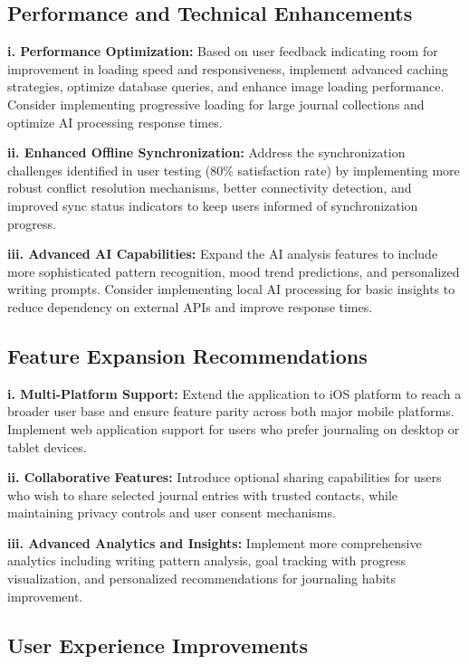 \subsection{Performance and Technical Enhancements}

\textbf{i. Performance Optimization:} Based on user feedback indicating room for improvement in loading speed and responsiveness, implement advanced caching strategies, optimize database queries, and enhance image loading performance. Consider implementing progressive loading for large journal collections and optimize AI processing response times.

\textbf{ii. Enhanced Offline Synchronization:} Address the synchronization challenges identified in user testing (80\% satisfaction rate) by implementing more robust conflict resolution mechanisms, better connectivity detection, and improved sync status indicators to keep users informed of synchronization progress.

\textbf{iii. Advanced AI Capabilities:} Expand the AI analysis features to include more sophisticated pattern recognition, mood trend predictions, and personalized writing prompts. Consider implementing local AI processing for basic insights to reduce dependency on external APIs and improve response times.

\subsection{Feature Expansion Recommendations}

\textbf{i. Multi-Platform Support:} Extend the application to iOS platform to reach a broader user base and ensure feature parity across both major mobile platforms. Implement web application support for users who prefer journaling on desktop or tablet devices.

\textbf{ii. Collaborative Features:} Introduce optional sharing capabilities for users who wish to share selected journal entries with trusted contacts, while maintaining privacy controls and user consent mechanisms.

\textbf{iii. Advanced Analytics and Insights:} Implement more comprehensive analytics including writing pattern analysis, goal tracking with progress visualization, and personalized recommendations for journaling habits improvement.

\subsection{User Experience Improvements}

